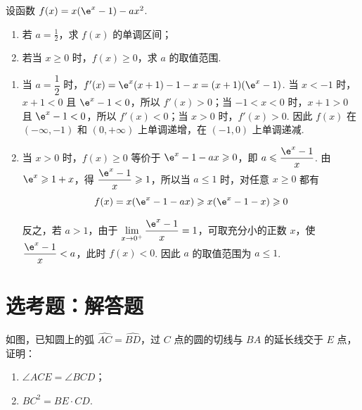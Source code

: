 \begin{problem}
设函数 \( f(x) = x(\e^x - 1) - ax^2 \).

\begin{enumerate}
\item 若 \(a = \frac{1}{2}\)，求 \(f(x)\) 的单调区间；
\item 若当 \(x \geqslant 0\) 时，\(f(x) \geqslant 0\)，求 \(a\) 的取值范围.
\end{enumerate}
\end{problem}

\begin{solution}
\begin{enumerate}
\item 当 \(a=\dfrac12\) 时，\(f'(x)=\e^x(x+1)-1-x=(x+1)(\e^x-1)\). 当 \(x<-1\) 时，\(x+1<0\) 且 \(\e^x-1<0\)，所以 \(f'(x)>0\)；当 \(-1<x<0\) 时，\(x+1>0\) 且 \(\e^x-1<0\)，所以 \(f'(x)<0\)；当 \(x>0\) 时，\(f'(x)>0\). 因此 \(f(x)\) 在 \((-\infty,-1)\) 和 \((0,+\infty)\) 上单调递增，在 \((-1,0)\) 上单调递减.

\item 当 \(x>0\) 时，\(f(x)\geqslant0\) 等价于
\(\e^x-1-ax\geqslant0\)，即 \(a\leqslant\dfrac{\e^x-1}{x}\). 由 \(\e^x\geqslant1+x\)，得 \(\dfrac{\e^x-1}{x}\geqslant1\)，所以当 \(a\leqslant1\) 时，对任意 \(x\geqslant0\) 都有
\[
f(x)=x(\e^x-1-ax)\geqslant x(\e^x-1-x)\geqslant0
\]

反之，若 \(a>1\)，由于 \(\displaystyle\lim_{x\to0^+}\dfrac{\e^x-1}{x}=1\)，可取充分小的正数 \(x\)，使 \(\dfrac{\e^x-1}{x}<a\)，此时 \(f(x)<0\). 因此 \(a\) 的取值范围为 \(a\leqslant1\).
\end{enumerate}
\end{solution}

\section{选考题：解答题}

\begin{problem}
如图，已知圆上的弧 \(\widehat{AC} = \widehat{BD}\)，过 \(C\) 点的圆的切线与 \(BA\) 的延长线交于 \(E\) 点，证明：

\begin{enumerate}
\item \(\angle ACE = \angle BCD\)；
\item \(BC^{2} = BE\cdot CD\).
\end{enumerate}

\end{problem}

